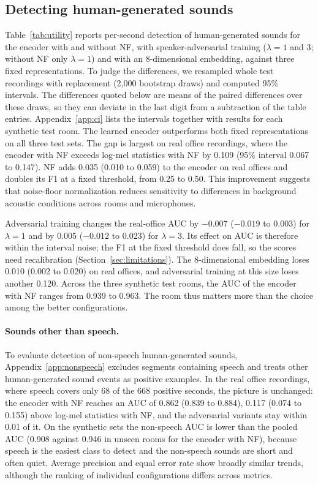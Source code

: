 \documentclass[11pt]{article}
\begin{document}
\subsection{Detecting human-generated sounds}
\label{sec:utility}
Table~\ref{tab:utility} reports per-second detection of human-generated sounds for the encoder with and without NF, with speaker-adversarial training ($\lambda=1$ and 3; without NF only $\lambda=1$) and with an 8-dimensional embedding, against three fixed representations. To judge the differences, we resampled whole test recordings with replacement (2,000 bootstrap draws) and computed 95\% intervals. The differences quoted below are means of the paired differences over these draws, so they can deviate in the last digit from a subtraction of the table entries. Appendix~\ref{app:ci} lists the intervals together with results for each synthetic test room. The learned encoder outperforms both fixed representations on all three test sets. The gap is largest on real office recordings, where the encoder with NF exceeds log-mel statistics with NF by 0.109 (95\% interval 0.067 to 0.147). NF adds 0.035 (0.010 to 0.059) to the encoder on real offices and doubles its F1 at a fixed threshold, from 0.25 to 0.50. This improvement suggests that noise-floor normalization reduces sensitivity to differences in background acoustic conditions across rooms and microphones.

Adversarial training changes the real-office AUC by $-0.007$ ($-0.019$ to 0.003) for $\lambda=1$ and by 0.005 ($-0.012$ to 0.023) for $\lambda=3$. Its effect on AUC is therefore within the interval noise; the F1 at the fixed threshold does fall, so the scores need recalibration (Section~\ref{sec:limitations}). The 8-dimensional embedding loses 0.010 (0.002 to 0.020) on real offices, and adversarial training at this size loses another 0.120. Across the three synthetic test rooms, the AUC of the encoder with NF ranges from 0.939 to 0.963. The room thus matters more than the choice among the better configurations.

\paragraph{Sounds other than speech.} To evaluate detection of non-speech human-generated sounds, Appendix~\ref{app:nonspeech} excludes segments containing speech and treats other human-generated sound events as positive examples. In the real office recordings, where speech covers only 68 of the 668 positive seconds, the picture is unchanged: the encoder with NF reaches an AUC of 0.862 (0.839 to 0.884), 0.117 (0.074 to 0.155) above log-mel statistics with NF, and the adversarial variants stay within 0.01 of it. On the synthetic sets the non-speech AUC is lower than the pooled AUC (0.908 against 0.946 in unseen rooms for the encoder with NF), because speech is the easiest class to detect and the non-speech sounds are short and often quiet. Average precision and equal error rate show broadly similar trends, although the ranking of individual configurations differs across metrics.
\end{document}
